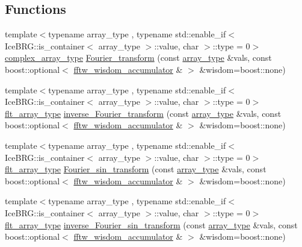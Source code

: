 \subsection*{Functions}
\begin{DoxyCompactItemize}
\item 
{\footnotesize template$<$typename array\+\_\+type , typename std\+::enable\+\_\+if$<$ Ice\+B\+R\+G\+::is\+\_\+container$<$ array\+\_\+type $>$\+::value, char $>$\+::type  = 0$>$ }\\\hyperlink{namespaceIceBRG_a02e79930ea75411b7883d2786b2fc5d7}{complex\+\_\+array\+\_\+type} \hyperlink{namespaceIceBRG_1_1Fourier_ad1efe4a24e34a8b704205a52629cb707}{Fourier\+\_\+transform} (const \hyperlink{main__lensing__model__fitter_8cpp_ad3282ec06f468e9f4cb74fee9155540e}{array\+\_\+type} \&vals, const boost\+::optional$<$ \hyperlink{classIceBRG_1_1Fourier_1_1fftw__wisdom__accumulator}{fftw\+\_\+wisdom\+\_\+accumulator} \& $>$ \&wisdom=boost\+::none)
\item 
{\footnotesize template$<$typename array\+\_\+type , typename std\+::enable\+\_\+if$<$ Ice\+B\+R\+G\+::is\+\_\+container$<$ array\+\_\+type $>$\+::value, char $>$\+::type  = 0$>$ }\\\hyperlink{namespaceIceBRG_acdca5c05302480eba6ba053449643a6d}{flt\+\_\+array\+\_\+type} \hyperlink{namespaceIceBRG_1_1Fourier_affb54aec64ffd50653afcdc145ece870}{inverse\+\_\+\+Fourier\+\_\+transform} (const \hyperlink{main__lensing__model__fitter_8cpp_ad3282ec06f468e9f4cb74fee9155540e}{array\+\_\+type} \&vals, const boost\+::optional$<$ \hyperlink{classIceBRG_1_1Fourier_1_1fftw__wisdom__accumulator}{fftw\+\_\+wisdom\+\_\+accumulator} \& $>$ \&wisdom=boost\+::none)
\item 
{\footnotesize template$<$typename array\+\_\+type , typename std\+::enable\+\_\+if$<$ Ice\+B\+R\+G\+::is\+\_\+container$<$ array\+\_\+type $>$\+::value, char $>$\+::type  = 0$>$ }\\\hyperlink{namespaceIceBRG_acdca5c05302480eba6ba053449643a6d}{flt\+\_\+array\+\_\+type} \hyperlink{namespaceIceBRG_1_1Fourier_aec332460e7be732629ad96425628a858}{Fourier\+\_\+sin\+\_\+transform} (const \hyperlink{main__lensing__model__fitter_8cpp_ad3282ec06f468e9f4cb74fee9155540e}{array\+\_\+type} \&vals, const boost\+::optional$<$ \hyperlink{classIceBRG_1_1Fourier_1_1fftw__wisdom__accumulator}{fftw\+\_\+wisdom\+\_\+accumulator} \& $>$ \&wisdom=boost\+::none)
\item 
{\footnotesize template$<$typename array\+\_\+type , typename std\+::enable\+\_\+if$<$ Ice\+B\+R\+G\+::is\+\_\+container$<$ array\+\_\+type $>$\+::value, char $>$\+::type  = 0$>$ }\\\hyperlink{namespaceIceBRG_acdca5c05302480eba6ba053449643a6d}{flt\+\_\+array\+\_\+type} \hyperlink{namespaceIceBRG_1_1Fourier_a2f02fa3fbb88e69e1355ac8823fa02e9}{inverse\+\_\+\+Fourier\+\_\+sin\+\_\+transform} (const \hyperlink{main__lensing__model__fitter_8cpp_ad3282ec06f468e9f4cb74fee9155540e}{array\+\_\+type} \&vals, const boost\+::optional$<$ \hyperlink{classIceBRG_1_1Fourier_1_1fftw__wisdom__accumulator}{fftw\+\_\+wisdom\+\_\+accumulator} \& $>$ \&wisdom=boost\+::none)

\end{DoxyCompactItemize}

